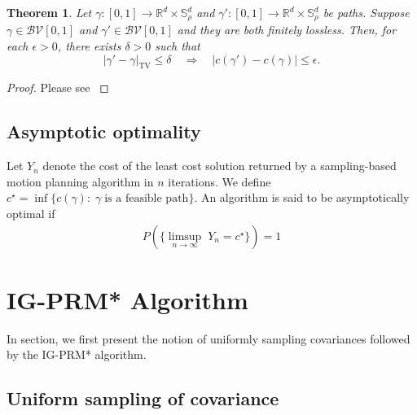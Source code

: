 \documentclass[Afour,sageh,times]{sagej}
\newtheorem{theorem}{\bf Theorem}
\begin{document}
\begin{theorem}
\label{theo:cont}
\normalfont Let $\gamma: [0,1]\rightarrow \mathbb{R}^d\times \mathbb{S}_\rho^d$ and $\gamma': [0,1]\rightarrow \mathbb{R}^d\times \mathbb{S}_\rho^d$ be paths. Suppose  $\gamma \in \mathcal{BV}[0, 1]$ and $\gamma' \in \mathcal{BV}[0, 1]$ and they are both finitely lossless. Then, for each $\epsilon > 0$, there exists $\delta > 0$ such that
\[
|\gamma'-\gamma|_{\text{TV}}\leq \delta \quad \Rightarrow \quad  |c(\gamma')-c(\gamma)| \leq \epsilon.
\]
\end{theorem}
\begin{proof}
Please see \cite[Appendix~D]{pedram2021gaussian}
\end{proof}

\subsection{Asymptotic optimality\label{sec:asy_opt}}
Let $Y_n$ denote the cost of the least cost solution returned by a sampling-based motion planning algorithm in $n$ iterations. We define $c^\star = \inf\{c(\gamma) :\; \gamma\; \text{is a feasible path}\}$. An algorithm is said to be asymptotically optimal if
\begin{align}
P(\{\underset{n\rightarrow\infty}{\limsup}\;Y_n =c^\star\}) = 1 
\end{align}
\section{IG-PRM* Algorithm\label{sec:algorithm}}
In section, we first present the notion of uniformly sampling covariances followed by the IG-PRM* algorithm.
\subsection{Uniform sampling of covariance}
\end{document}
